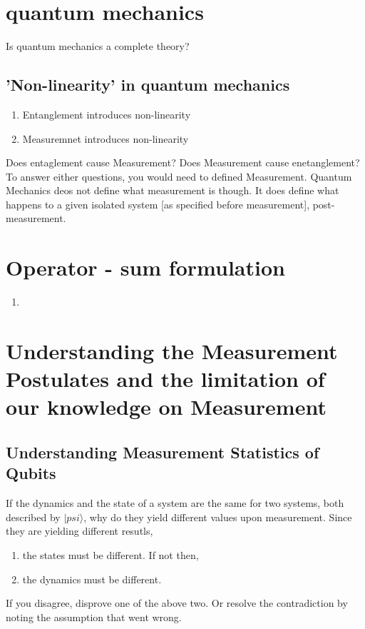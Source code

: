 \documentclass[a4paper,12pt]{amsbook}
\newcommand{\0}{{$|0\rangle$}}
\newcommand{\1}{{$|1\rangle$}}
\begin{document}
\begin{enumerate}
    \chapter{quantum mechanics}
    Is quantum mechanics a complete theory? 
    
    \section{'Non-linearity' in quantum mechanics}
    \begin{enumerate}
        \item Entanglement introduces non-linearity
        \item Measuremnet introduces non-linearity
    \end{enumerate}
    Does entaglement cause Measurement? Does Measurement cause enetanglement?  To answer either questions, you would need to defined Measurement. 
    Quantum Mechanics deos not define what measurement is though. It does define what happens to a given isolated system [as specified before measurement], post-measurement.

    \chapter{Operator - sum formulation}
    \begin{enumerate}
        \item 
    \end{enumerate}

    \chapter{Understanding the Measurement Postulates and the limitation of our knowledge on Measurement}
    \section{Understanding Measurement Statistics of Qubits}
    If the dynamics and the state of a system are the same for two systems, both described by $|psi\rangle$, why do they yield different values upon measurement. Since they are yielding different resutls,
    \begin{enumerate}
        \item the states must be different. If not then,
        \item the dynamics must be different. 
    \end{enumerate}
    If you disagree, disprove one of the above two. Or resolve the contradiction by noting the assumption that went wrong.
    

\end{enumerate}
\end{document}
